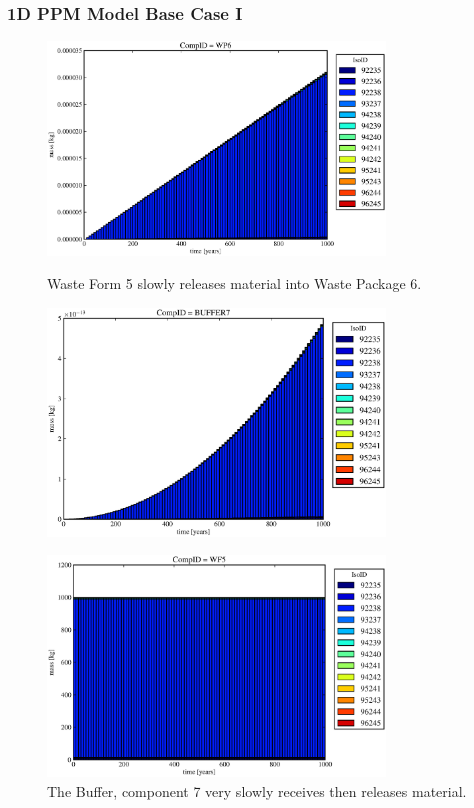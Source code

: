 \begin{frame}
\frametitle{1D PPM Model Base Case I}
\begin{figure}[ht]
\begin{minipage}[b]{0.45\linewidth}

  \includegraphics[width=0.8\textwidth]{./images/od2.eps}
  \caption[Case ODI Waste Form Contaminants.]{
    Waste Form 5 slowly releases material into Waste Package 6.
    }
  \label{fig:drIVwf5}
  \includegraphics[width=0.8\textwidth]{./images/od3.eps}
  \caption[Case ODI Buffer Contaminants]{
    The Buffer, component 7 very slowly receives then releases material.
    }
  \label{fig:drIVbuff}
\end{minipage}
\hspace{0.05\linewidth}
\begin{minipage}[b]{0.45\linewidth}
  \includegraphics[width=0.8\textwidth]{./images/od1.eps}

\end{minipage}
\end{figure}
\end{frame}
